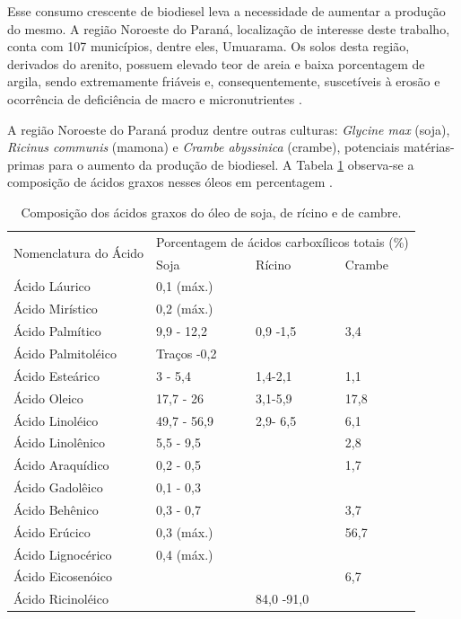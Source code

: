 Esse consumo crescente de biodiesel leva a  necessidade de aumentar a produção do mesmo. A região  Noroeste do Paraná, localização de interesse deste trabalho, conta com 107 municípios, dentre eles,  Umuarama.  Os solos desta região, derivados do arenito, possuem elevado teor de areia e baixa porcentagem de argila, sendo extremamente friáveis e, consequentemente,  suscetíveis à erosão e ocorrência de deficiência de macro e micronutrientes \cite{Fonseca2005}.
    
A região  Noroeste do Paraná produz dentre outras culturas: \textit{Glycine max} (soja), \textit{Ricinus communis} (mamona) e \textit{Crambe abyssinica} (crambe), potenciais matérias-primas para o aumento da produção de biodiesel. A Tabela \ref{tab:angelica} observa-se a composição de ácidos graxos nesses óleos em percentagem \cite{Angelica}.

\begin{table}[H]
\centering
\caption{Composição dos ácidos graxos do óleo de soja, de rícino e de cambre.}
\begin{tabular}{lp{2.5cm}p{2.5cm}p{2.5cm}}
\hline
\multirow{2}{*}{Nomenclatura do Ácido} & \multicolumn{3}{l}{Porcentagem de ácidos carboxílicos totais (\%)}  \\
    & Soja  & Rícino & Crambe  \\
    \hline
     Ácido Láurico      & 0,1 (máx.)  &  & \\
     Ácido Mirístico    & 0,2 (máx.)  &  &  \\
     Ácido Palmítico    & 9,9 - 12,2  & 0,9 -1,5 & 3,4  \\
     Ácido Palmitoléico & Traços -0,2 &  &  \\
     Ácido Esteárico    & 3 - 5,4     & 1,4-2,1  & 1,1 \\
     Ácido Oleico       & 17,7 - 26   & 3,1-5,9 & 17,8 \\
     Ácido Linoléico    & 49,7 - 56,9 & 2,9- 6,5 & 6,1 \\
     Ácido Linolênico   & 5,5 - 9,5   &  & 2,8 \\
     Ácido Araquídico   & 0,2 - 0,5   &  & 1,7 \\
     Ácido Gadolêico    & 0,1 - 0,3   &  &  \\
     Ácido Behênico     & 0,3 - 0,7   &  & 3,7 \\
     Ácido Erúcico      & 0,3 (máx.)  &  & 56,7 \\
     Ácido Lignocérico  & 0,4 (máx.)  &  &  \\
     Ácido Eicosenóico  &             &  & 6,7 \\
     Ácido Ricinoléico  &             & 84,0 -91,0 &  \\
     \hline
\end{tabular}
\label{tab:angelica}
\end{table}


